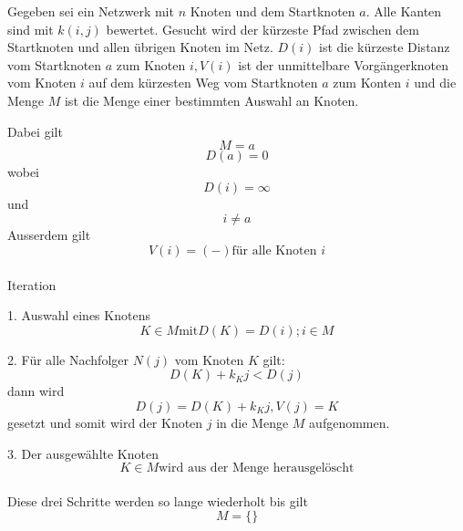 Gegeben sei ein Netzwerk mit $n$ Knoten und dem Startknoten $a$.
Alle Kanten sind mit $k(i, j)$ bewertet.
Gesucht wird der kürzeste Pfad zwischen dem Startknoten und allen übrigen Knoten im Netz.
$D(i)$ ist die kürzeste Distanz vom Startknoten $a$ zum Knoten $i, V(i)$ ist der unmittelbare Vorgängerknoten vom Knoten $i$ auf dem kürzesten Weg vom Startknoten $a$ zum Konten $i$ und die Menge $M$ ist die Menge einer bestimmten Auswahl an Knoten.

Dabei gilt
\begin{equation}M={a}\end{equation}
\begin{equation}D(a)=0\end{equation} wobei
\begin{equation}D(i)=\infty\end{equation} und
\begin{equation}i \neq a \end{equation}
Ausserdem gilt \begin{equation}V(i)=(-) \text{für alle Knoten $i$}\end{equation}\\

Iteration

1. Auswahl eines Knotens \begin{equation} K\in M \text{mit} D(K)=D(i);i\in M\end{equation}

2. Für alle Nachfolger $N(j)$ vom Knoten $K$ gilt:
\begin{equation}D(K) + k_Kj < D(j)\end{equation} dann wird \begin{equation}D(j) = D(K) + k_Kj, V(j) = K\end{equation} gesetzt und somit wird der Knoten $j$ in die Menge $M$ aufgenommen.

3. Der ausgewählte Knoten \begin{equation}K\in M\text{wird aus der Menge herausgelöscht}\end{equation}\\
Diese drei Schritte werden so lange wiederholt bis gilt
\begin{equation}M=\{\}\end{equation}

